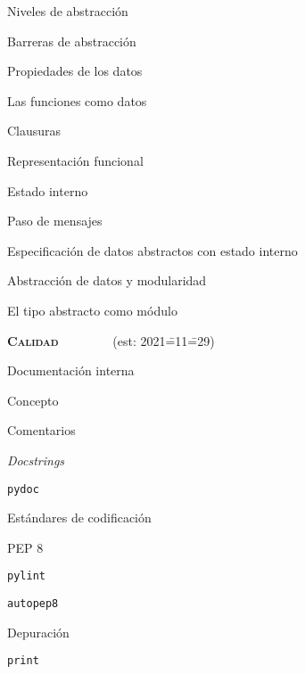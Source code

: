 \begin{longenum}
\begin{longenum}
\begin{longenum}
            \item Niveles de abstracción
            \item Barreras de abstracción
            \item Propiedades de los datos
        \end{longenum}
        \item Las funciones como datos
        \begin{longenum}
            \item Clausuras
            \item Representación funcional
            \item Estado interno
            \item Paso de mensajes
            \item Especificación de datos abstractos con estado interno
        \end{longenum}
        \item Abstracción de datos y modularidad
        \begin{longenum}
            \item El tipo abstracto como módulo
        \end{longenum}
    \end{longenum}
    \item \textbf{\textsc{Calidad}} \ \ \ \ \ \ \ \ (est: 2021\==11\==29)
    \begin{longenum}
        \item Documentación interna
        \begin{longenum}
            \item Concepto
            \item Comentarios
            \item \textit{Docstrings}
            \item \texttt{pydoc}
            \item Estándares de codificación
            \begin{longenum}
                \item PEP 8
                \item \texttt{pylint}
                \item \texttt{autopep8}
            \end{longenum}
        \end{longenum}
        \item Depuración
        \begin{longenum}
            \item \texttt{print}

\end{longenum}
\end{longenum}
\end{longenum}
